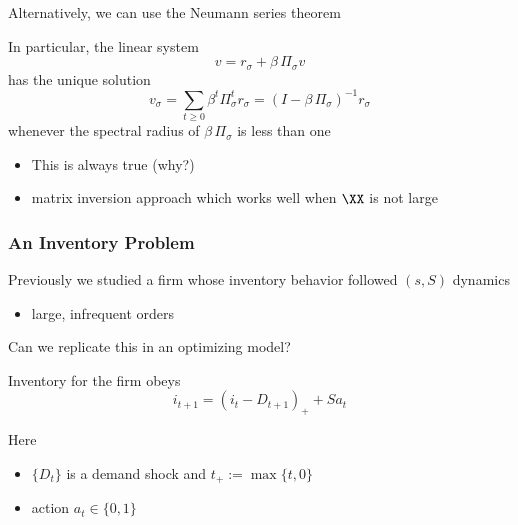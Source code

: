 \begin{frame}
    
    Alternatively, we can use the Neumann series theorem 
    
    In particular, the linear system
    \begin{equation*}
        v = r_\sigma + \beta \, \Pi_\sigma v
    \end{equation*}
    has the unique solution
    \begin{equation*}
        \label{eq:yavs}
        v_\sigma 
        = \sum_{t \geq 0} \beta^t \Pi_\sigma^t r_\sigma
        = (I - \beta \, \Pi_\sigma)^{-1} r_\sigma
    \end{equation*}
    whenever the spectral radius of $\beta \, \Pi_\sigma$ is less than one

    \begin{itemize}
        \item This is always true (why?)
        \item matrix inversion approach which works well when $\XX$ is not large
    \end{itemize}
    


\end{frame}



\begin{frame}
    \frametitle{An Inventory Problem}

    Previously we studied a firm whose inventory behavior followed $(s,S)$ dynamics
    
    \begin{itemize}
        \item large, infrequent orders
    \end{itemize}

    Can we replicate this in an optimizing model?

    Inventory for the firm obeys
    \begin{equation*}
        \label{eq:i_lom}
        i_{t+1} = (i_t - D_{t+1})_+ + S a_t
    \end{equation*}

    Here 
    \begin{itemize}
        \item $\{D_t\}$ is a  demand shock and $t_+ := \max\{t, 0\}$
        \item action $a_t \in \{0, 1\}$
    \end{itemize}
    


\end{frame}



